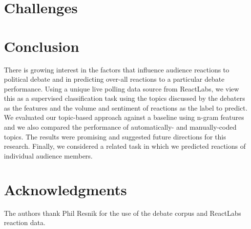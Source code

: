 \documentclass[11pt]{article}
\begin{document}
\section{Challenges}


\section{Conclusion}
  There is growing interest in the factors that influence audience reactions to political debate and in predicting over-all reactions to a particular debate performance.  Using a unique live polling data source from ReactLabs, we view this as a supervised classification task using the topics discussed by the debaters as the features and the volume and sentiment of reactions as the label to predict.  We evaluated our topic-based approach against a baseline using n-gram features and we also compared the performance of automatically- and manually-coded topics.  The results were promising and suggested future directions for this research.  Finally, we considered a related task in which we predicted reactions of individual audience members.
  
\section*{Acknowledgments}
The authors thank Phil Resnik for the use of the debate corpus and ReactLabs reaction data.



\end{document}

